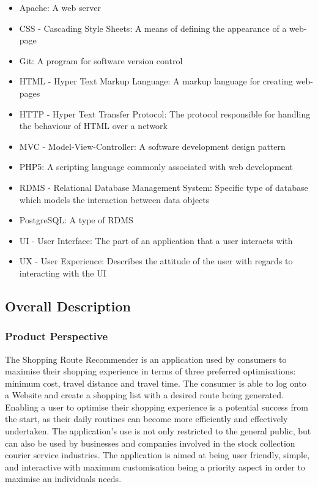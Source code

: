 \documentclass[10pt,twocolumn]{witseiepaper}
\begin{document}
			\begin{itemize}
				\item Apache: A web server 
				\item CSS - Cascading Style Sheets: A means of defining the appearance of a web-page
				\item Git: A program for software version control
				\item HTML - Hyper Text Markup Language: A markup language for creating web-pages
				\item HTTP - Hyper Text Transfer Protocol: The protocol responsible for handling the behaviour of HTML over a network
				\item MVC - Model-View-Controller: A software development design pattern
				\item PHP5: A scripting language commonly associated with web development
				\item RDMS - Relational Database Management System: Specific type of database which models the interaction between data objects
				\item PostgreSQL: A type of RDMS
				\item UI - User Interface: The part of an application that a user interacts with
				\item UX - User Experience: Describes the attitude of the user with regards to interacting with the UI
				
			\end{itemize}
		
	\subsection{Overall Description}
		
		\subsubsection{Product Perspective}
		
			The Shopping Route Recommender is an application used by consumers to maximise their shopping experience in terms of three preferred optimisations: minimum cost, travel distance and travel time. The consumer is able to log onto a Website and create a shopping list with a desired route being generated.  Enabling a user to optimise their shopping experience is a potential success from the start, as their daily routines can become more efficiently and effectively undertaken. The application's use is not only restricted to the general public, but can also be used by businesses and companies involved in the stock collection courier service industries. The application is aimed at being user friendly, simple, and interactive with maximum customisation being a priority aspect in order to maximise an individuals needs. 
		
\end{document}
